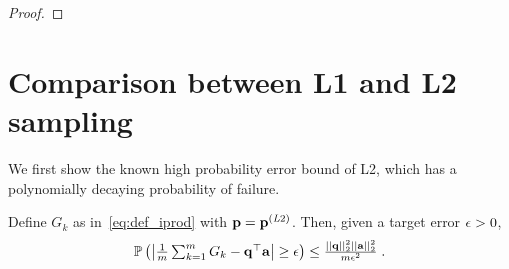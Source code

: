 \begin{proof}
\end{proof}

\vspace{-5pt}
\section{Comparison between L1 and L2 sampling} %
\label{sec:proof-lem_p_l2}
\vspace{-5pt}

We first show the known high probability error bound of L2, which has a polynomially decaying probability of failure.
\begin{lem} \cite[Lemma 3.4]{jain10hashing} \label{lem:p_l2}
  Define $G_k$ as in~\eqref{eq:def_iprod} with ${{\mathbf p}}={{\mathbf p}}^{(\emph{\ensuremath{\mathbf{\text{L}}}}2)}$.
  Then, given a target error $\epsilon>0$,
  \vspace{-4pt}
  \begin{equation}\begin{aligned}
    \textstyle \P\lt( \lt|\fr{1}{m}\sum_{k=1}^m G_k - \q^\T\a \rt| \ge \eps \rt) \le \fr{||\q||_2^2||\a||_2^2}{m\eps^2} \;.\label{eq:lem-p_l2}
  \end{aligned}\end{equation}
\end{lem}
\vspace{-8pt}

